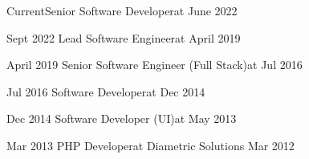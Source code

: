 %
%
%
\begin{experiences}
    \experiencenew
    {Current}{Senior Software Developer}{at {}}
    {June 2022}
    
    \experiencenew
    {Sept 2022}     {Lead Software Engineer}{at {}}
    {April 2019}
    
    \experiencenew
    {April 2019}     {Senior Software Engineer (Full Stack)}{at {}}
    {Jul 2016}
    
    \experiencenew
    {Jul 2016}     {Software Developer}{at {}}
    {Dec 2014}

    \experiencenew
    {Dec 2014}     {Software Developer (UI)}{at {}}
    {May 2013}
    
    \experiencenewlast
    {Mar 2013}     {PHP Developer}{at Diametric Solutions}
    {Mar 2012}
\end{experiences}